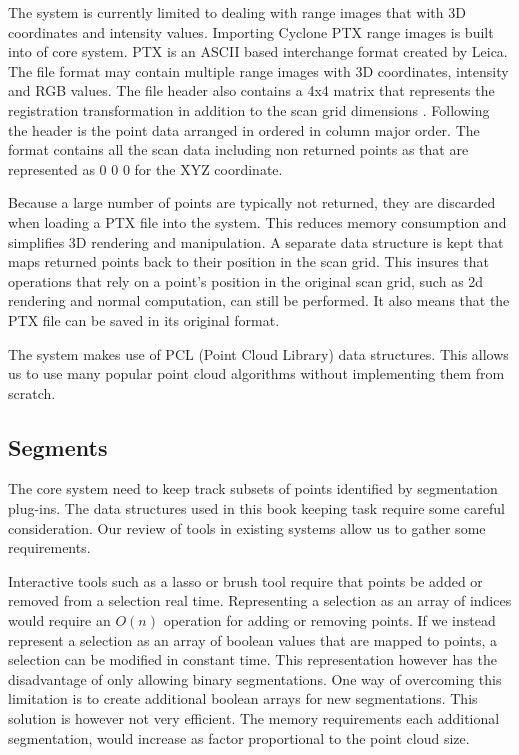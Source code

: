 The system is currently limited to dealing with range images that with 3D coordinates and intensity values. Importing Cyclone PTX range images is built into of core system. PTX is an ASCII based interchange format created by Leica. The file format may contain multiple range images with 3D coordinates, intensity and RGB values. The file header also contains a 4x4 matrix that represents the registration transformation in addition to the scan grid dimensions \cite{Leica}. Following the header is the point data arranged in ordered in column major order. The format contains all the scan data including non returned points as that are represented as 0 0 0 for the XYZ coordinate.

Because a large number of points are typically not returned, they are discarded when loading a PTX file into the system. This reduces memory consumption and simplifies 3D rendering and manipulation. A separate data structure is kept that maps returned points back to their position in the scan grid. This insures that operations that rely on a point's position in the original scan grid, such as 2d rendering and normal computation, can still be performed. It also means that the PTX file can be saved in its original format.

The system makes use of PCL (Point Cloud Library) \cite{Rusu2011} data structures. This allows us to use many popular point cloud algorithms without implementing them from scratch.

\subsection{Segments} \label{sec:segments}

The core system need to keep track subsets of points identified by segmentation plug-ins. The data structures used in this book keeping task require some careful consideration. Our review of tools in existing systems allow us to gather some requirements.

Interactive tools such as a lasso or brush tool require that points be added or removed from a selection real time. Representing a selection as an array of indices would require an $O(n)$ operation for adding or removing points. If we instead represent a selection as an array of boolean values that are mapped to points, a selection can be modified in constant time. This representation however has the disadvantage of only allowing binary segmentations. One way of overcoming this limitation is to create additional boolean arrays for new segmentations. This solution is however not very efficient. The memory requirements each additional segmentation, would increase as factor proportional to the point cloud size.

